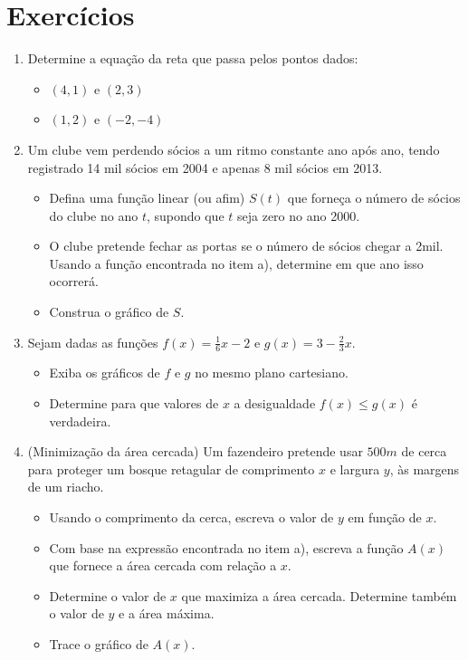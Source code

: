 \section{Exercícios}
\begin{enumerate}

\item Determine a equação da reta que passa pelos pontos dados:
\begin{itemize}
\item[a)] $(4,1)$ e $(2,3)$
\item[b)] $(1,2)$ e $(-2,-4)$
\end{itemize}

\item Um clube vem perdendo sócios a um ritmo constante ano após ano, tendo registrado 14 mil sócios em 2004 e apenas 8 mil sócios em 2013.

\begin{itemize}
\item[a)] Defina uma função linear (ou afim) $S(t)$ que forneça o número de sócios do clube no ano $t$, supondo que $t$ seja zero no ano 2000.
\item[b)] O clube pretende fechar as portas se o número de sócios chegar a 2mil. Usando a função encontrada no item a), determine em que ano isso ocorrerá.

\item[c)] Construa o gráfico de $S$.
\end{itemize}
\item Sejam dadas as funções $f(x)= \frac{1}{6}x-2$ e $g(x)=3-\frac{2}{3}x$.
\begin{itemize}
\item[a)] Exiba os gráficos de $f$ e $g$ no mesmo plano cartesiano.
\item[b)] Determine para que valores de $x$ a desigualdade $f(x) \leq g(x)$ é verdadeira.
\end{itemize}
\item (Minimização da área cercada) Um fazendeiro pretende usar $500m$ de cerca para proteger um bosque retagular de comprimento $x$ e largura $y$, às margens de um riacho.

\begin{itemize}
\item[a)] Usando o comprimento da cerca, escreva o valor de $y$ em função de $x$.
\item[b)] Com base na expressão encontrada no item a), escreva a função $A(x)$ que fornece a área cercada com relação a $x$.
\item[c)] Determine o valor de $x$ que maximiza a área cercada. Determine também o valor de $y$ e a área máxima.
\item[d] Trace o gráfico de $A(x)$.
\end{itemize}


\end{enumerate}
